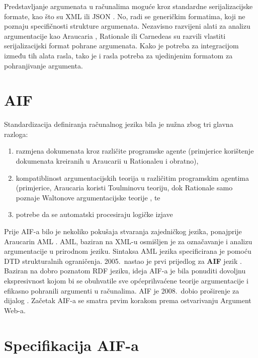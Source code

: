 Predstavljanje argumenata u računalima moguće kroz standardne 
serijalizacijske formate, kao što su
XML  ili JSON . 
No, radi se generičkim formatima, koji ne poznaju specifičnosti 
strukture argumenata. Nezavisno razvijeni alati 
za analizu argumentacije kao Araucaria \citep{reed2004araucaria},
Rationale \citep{van2007rationale}
ili Carnedeas \citep{gordon2006carneades}
su razvili vlastiti serijalizacijski format pohrane
argumenata. Kako je potreba za integracijom između tih alata rasla, tako
je i rasla potreba za ujedinjenim formatom za pohranjivanje argumenta. 

\section{AIF}

Standardizacija definiranja računalnog jezika bila je nužna zbog tri glavna razloga:
\begin{enumerate}
    \item razmjena dokumenata kroz različite programske agente (primjerice 
korištenje dokumenata kreiranih u Araucarii u Rationaleu i obratno), 
    \item kompatiblinost argumentacijskih teorija u različitim programskim agentima
(primjerice, Araucaria koristi Toulminovu teoriju, dok Rationale samo poznaje 
Waltonove argumentacijske teorije \citep{walton2012argument}, te 
    \item potrebe da se automatski procesiraju logičke izjave
\end{enumerate}

Prije AIF-a bilo je nekoliko pokušaja stvaranja zajedničkog jezika, ponajprije
Araucarin AML . AML, baziran na XML-u
 osmišljen je za označavanje i analizu
argumentacije u prirodnom jeziku. Sintaksa AML jezika specificirana je pomoću
DTD  strukturalnih ograničenja.  
2005.\ nastao je prvi prijedlog za \textbf{AIF}  jezik \citep{chesnevar2006towards}. 
Baziran na dobro poznatom RDF jeziku, ideja AIF-a
je bila ponuditi dovoljnu ekspresivnost kojom bi se obuhvatile sve
općeprihvaćene teorije argumentacije i efikasno pohranili 
argumenti u računalima. 
AIF je 2008.\ dobio proširenje za dijalog \citep{reed2008aif+}.
Začetak AIF-a se smatra prvim korakom
prema ostvarivanju Argument Web-a. 


\section{Specifikacija AIF-a}

